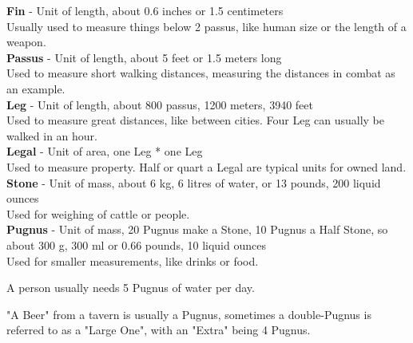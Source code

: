 \textbf{Fin} - Unit of length, about 0.6 inches or 1.5 centimeters\\
Usually used to measure things below 2 passus, like human size or the length of a weapon.\\


\textbf{Passus} - Unit of length, about 5 feet or 1.5 meters long\\
Used to measure short walking distances, measuring the distances in combat as an example.\\


\textbf{Leg} - Unit of length, about 800 passus, 1200 meters, 3940 feet\\
Used to measure great distances, like between cities.
Four Leg can usually be walked in an hour.\\


\textbf{Legal} - Unit of area, one Leg * one Leg\\
Used to measure property.
Half or quart a Legal are typical units for owned land.\\


\textbf{Stone} - Unit of mass, about 6 kg, 6 litres of water, or 13 pounds, 200 liquid ounces\\
Used for weighing of cattle or people.\\


\textbf{Pugnus} - Unit of mass, 20 Pugnus make a Stone, 10 Pugnus a Half Stone, so about 300 g, 300 ml or 0.66 pounds, 10 liquid ounces\\
Used for smaller measurements, like drinks or food.

A person usually needs 5 Pugnus of water per day.

"A Beer" from a tavern is usually a Pugnus, sometimes a double-Pugnus is referred to as a  "Large One", with an "Extra" being 4 Pugnus.\\

